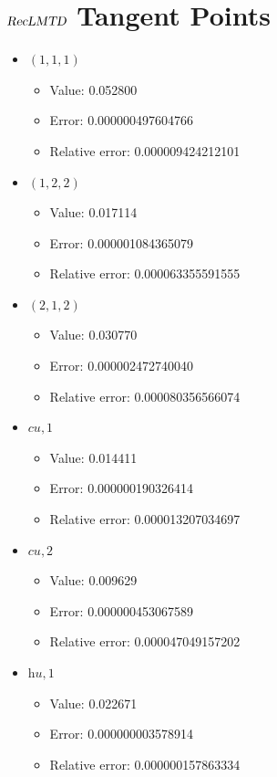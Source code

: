 \documentclass{article}%
\begin{document}
\section{$\textsl{RecLMTD}$ Tangent Points}%
\thispagestyle{plain}%
\begin{itemize}%
	\item $(1, 1, 1)$%
	\begin{itemize}%
		\item Value: 0.052800%
		\item Error: 0.000000497604766%
		\item Relative error: 0.000009424212101%
	\end{itemize}%
	\item $(1, 2, 2)$%
	\begin{itemize}%
		\item Value: 0.017114%
		\item Error: 0.000001084365079%
		\item Relative error: 0.000063355591555%
	\end{itemize}%
	\item $(2, 1, 2)$%
	\begin{itemize}%
		\item Value: 0.030770%
		\item Error: 0.000002472740040%
		\item Relative error: 0.000080356566074%
	\end{itemize}%
	\item $\textit{cu},1$%
	\begin{itemize}%
		\item Value: 0.014411%
		\item Error: 0.000000190326414%
		\item Relative error: 0.000013207034697%
	\end{itemize}%
	\item $\textit{cu},2$%
	\begin{itemize}%
		\item Value: 0.009629%
		\item Error: 0.000000453067589%
		\item Relative error: 0.000047049157202%
	\end{itemize}%
	\item $\textit{hu},1$%
	\begin{itemize}%
		\item Value: 0.022671%
		\item Error: 0.000000003578914%
		\item Relative error: 0.000000157863334%
	\end{itemize}%
\end{itemize}%
\end{document}
